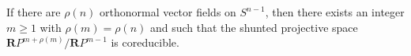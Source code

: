 If there are $\rho(n)$ orthonormal vector fields on $S^{n-1}$, then there exists an integer $m \geq 1$ with $\rho(m) = \rho(n)$ and such that the shunted projective space $\mathbf{R}P^{m+\rho(m)}/\mathbf{R}P^{m-1}$ is coreducible.
